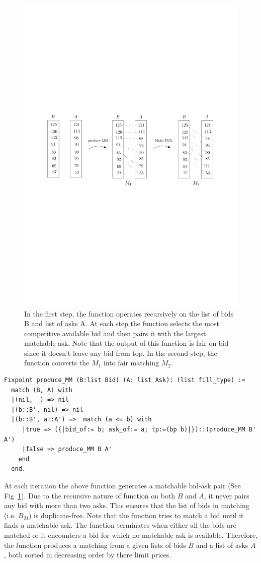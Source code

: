 \documentclass[a4paper,UKenglish,cleveref, autoref]{lipics-v2019}
\begin{document}
\begin{figure}[h!]
\centering
\includegraphics[width=.8\textwidth]{MM.pdf}
\caption{In the first step, the function  operates recursively on the list of bids B and list of asks A. At each step the function  selects the most competitive available bid and then pairs it with the largest matchable ask. Note that the output of this function is fair on bid since it doesn't leave any bid from top. In the second step, the function  converts the $M_1$ into fair matching $M_2$. }
\label{fig:mm}
\end{figure}

\begin{verbatim}
Fixpoint produce_MM (B:list Bid) (A: list Ask): (list fill_type) :=
  match (B, A) with
  |(nil, _) => nil
  |(b::B', nil) => nil              
  |(b::B', a::A') =>  match (a <= b) with
     |true => ({|bid_of:= b; ask_of:= a; tp:=(bp b)|})::(produce_MM B' A')
     |false => produce_MM B A'
    end
  end. 
\end{verbatim}

At each iteration the above function generates a matchable bid-ask pair (See Fig~\ref{fig:mm}). Due to the recursive nature of  function   on both $B$ and $A$, it never pairs any bid with more than two asks. This ensures that the list of bids in matching (i.e. $B_M$) is duplicate-free. Note that the function  tries to match a bid until it finds a matchable ask. The function terminates when either all the bids are matched or it encounters a bid for which no matchable ask is available.  Therefore, the function  produces a matching from a given lists of bids $B$ and a list of asks $A$, both sorted in decreasing order by there limit prices.  
\end{document}
